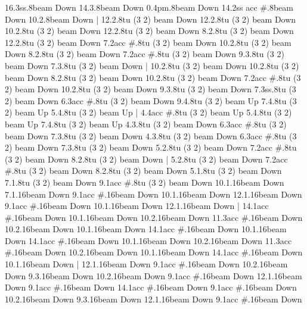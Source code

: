       16.3{ss}.8{beam Down}
      14.3.8{beam Down}
      0.4{pm}.8{beam Down}
      14.2{ss acc #}.8{beam Down}
      10.2.8{beam Down}
    |
      12.2.8{tu (3 2) beam Down}
      12.2.8{tu (3 2) beam Down}
      10.2.8{tu (3 2) beam Down}
      12.2.8{tu (3 2) beam Down}
      8.2.8{tu (3 2) beam Down}
      12.2.8{tu (3 2) beam Down}
      7.2{acc #}.8{tu (3 2) beam Down}
      10.2.8{tu (3 2) beam Down}
      8.2.8{tu (3 2) beam Down}
      7.2{acc #}.8{tu (3 2) beam Down}
      9.3.8{tu (3 2) beam Down}
      7.3.8{tu (3 2) beam Down}
    |
      10.2.8{tu (3 2) beam Down}
      10.2.8{tu (3 2) beam Down}
      8.2.8{tu (3 2) beam Down}
      10.2.8{tu (3 2) beam Down}
      7.2{acc #}.8{tu (3 2) beam Down}
      10.2.8{tu (3 2) beam Down}
      9.3.8{tu (3 2) beam Down}
      7.3{ss}.8{tu (3 2) beam Down}
      6.3{acc #}.8{tu (3 2) beam Down}
      9.4.8{tu (3 2) beam Up}
      7.4.8{tu (3 2) beam Up}
      5.4.8{tu (3 2) beam Up}
    |
      4.4{acc #}.8{tu (3 2) beam Up}
      5.4.8{tu (3 2) beam Up}
      7.4.8{tu (3 2) beam Up}
      4.3.8{tu (3 2) beam Down}
      6.3{acc #}.8{tu (3 2) beam Down}
      7.3.8{tu (3 2) beam Down}
      4.3.8{tu (3 2) beam Down}
      6.3{acc #}.8{tu (3 2) beam Down}
      7.3.8{tu (3 2) beam Down}
      5.2.8{tu (3 2) beam Down}
      7.2{acc #}.8{tu (3 2) beam Down}
      8.2.8{tu (3 2) beam Down}
    |
      5.2.8{tu (3 2) beam Down}
      7.2{acc #}.8{tu (3 2) beam Down}
      8.2.8{tu (3 2) beam Down}
      5.1.8{tu (3 2) beam Down}
      7.1.8{tu (3 2) beam Down}
      9.1{acc #}.8{tu (3 2) beam Down}
      10.1.16{beam Down}
      7.1.16{beam Down}
      9.1{acc #}.16{beam Down}
      10.1.16{beam Down}
      12.1.16{beam Down}
      9.1{acc #}.16{beam Down}
      10.1.16{beam Down}
      12.1.16{beam Down}
    |
      14.1{acc #}.16{beam Down}
      10.1.16{beam Down}
      10.2.16{beam Down}
      11.3{acc #}.16{beam Down}
      10.2.16{beam Down}
      10.1.16{beam Down}
      14.1{acc #}.16{beam Down}
      10.1.16{beam Down}
      14.1{acc #}.16{beam Down}
      10.1.16{beam Down}
      10.2.16{beam Down}
      11.3{acc #}.16{beam Down}
      10.2.16{beam Down}
      10.1.16{beam Down}
      14.1{acc #}.16{beam Down}
      10.1.16{beam Down}
    |
      12.1.16{beam Down}
      9.1{acc #}.16{beam Down}
      10.2.16{beam Down}
      9.3.16{beam Down}
      10.2.16{beam Down}
      9.1{acc #}.16{beam Down}
      12.1.16{beam Down}
      9.1{acc #}.16{beam Down}
      14.1{acc #}.16{beam Down}
      9.1{acc #}.16{beam Down}
      10.2.16{beam Down}
      9.3.16{beam Down}
      12.1.16{beam Down}
      9.1{acc #}.16{beam Down}
